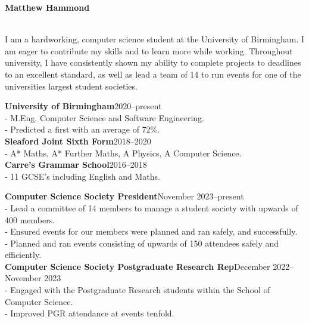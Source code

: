 \documentclass[twoside]{article}
\begin{document}
\begin{center}
    \noindent\huge\textbf{Matthew Hammond}
\end{center}\hr
{}
\hfill
{}\\
\hfill
{}\hr
I am a hardworking, computer science student at the University of Birmingham. I am eager to contribute my skills and to learn more while working. Throughout university, I have consistently shown my ability to complete projects to deadlines to an excellent standard, as well as lead a team of 14 to run events for one of the universities largest student societies.

\textbf{University of Birmingham}\hfill 2020--present\\
- M.Eng. Computer Science and Software Engineering.\\
- Predicted a first with an average of 72\%.\vspace{2pt}\\
\textbf{Sleaford Joint Sixth Form}\hfill 2018--2020\\
- A* Maths, A* Further Maths, A Physics, A Computer Science.\vspace{2pt}\\
\textbf{Carre’s Grammar School}\hfill 2016--2018\\
- 11 GCSE's including English and Maths.

\textbf{Computer Science Society President}\hfill November 2023--present\\
- Lead a committee of 14 members to manage a student society with upwards of 400 members.\\
- Ensured events for our members were planned and ran safely, and successfully.\\
- Planned and ran events consisting of upwards of 150 attendees safely and efficiently.\vspace{2pt}\\
\textbf{Computer Science Society Postgraduate Research Rep}\hfill December 2022--November 2023\\
- Engaged with the Postgraduate Research students within the School of Computer Science.\\
- Improved PGR attendance at events tenfold.
\end{document}
